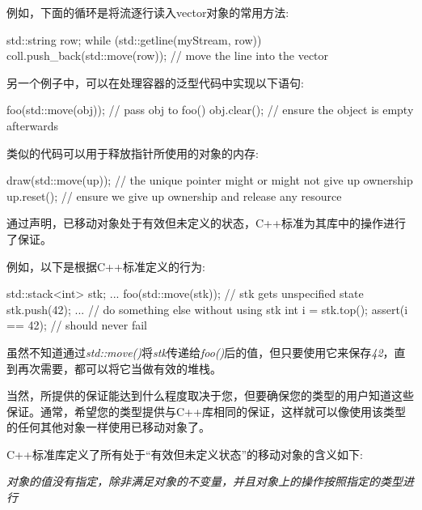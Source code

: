 例如，下面的循环是将流逐行读入vector对象的常用方法:\par

\begin{codebox}[cpp]
std::string row;
while (std::getline(myStream, row)) {
  coll.push_back(std::move(row)); // move the line into the vector
}
\end{codebox}

另一个例子中，可以在处理容器的泛型代码中实现以下语句:\par

\begin{codebox}[cpp]
foo(std::move(obj)); // pass obj to foo()
obj.clear(); // ensure the object is empty afterwards
\end{codebox}

类似的代码可以用于释放指针所使用的对象的内存:\par

\begin{codebox}[cpp]
draw(std::move(up)); // the unique pointer might or might not give up ownership
up.reset(); // ensure we give up ownership and release any resource
\end{codebox}

通过声明，已移动对象处于有效但未定义的状态，C++标准为其库中的操作进行了保证。\par

例如，以下是根据C++标准定义的行为:\par

\begin{codebox}[cpp]
std::stack<int> stk;
...
foo(std::move(stk)); // stk gets unspecified state
stk.push(42);
... // do something else without using stk
int i = stk.top();
assert(i == 42); // should never fail
\end{codebox}

虽然不知道通过\textit{std::move()}将\textit{stk}传递给\textit{foo()}后的值，但只要使用它来保存\textit{42}，直到再次需要，都可以将它当做有效的堆栈。\par

当然，所提供的保证能达到什么程度取决于您，但要确保您的类型的用户知道这些保证。通常，希望您的类型提供与C++库相同的保证，这样就可以像使用该类型的任何其他对象一样使用已移动对象了。\par


C++标准库定义了所有处于“有效但未定义状态”的移动对象的含义如下:\par

\textit{对象的值没有指定，除非满足对象的不变量，并且对象上的操作按照指定的类型进行}\par


